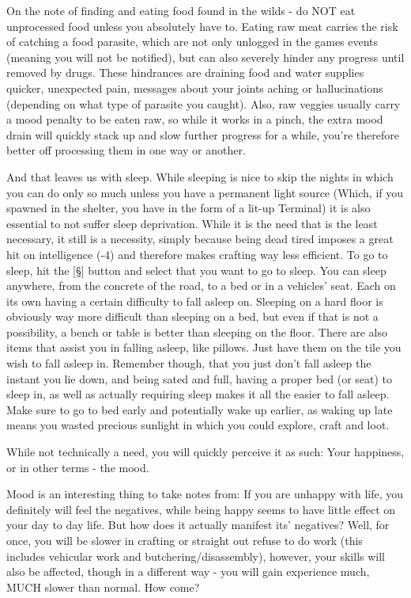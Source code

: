 On the note of finding and eating food found in the wilds - do NOT eat unprocessed food unless you absolutely have to. Eating raw meat carries the risk of catching a food parasite, which are not only unlogged in the games events (meaning you will not be notified), but can also severely hinder any progress until removed by drugs. These hindrances are draining food and water supplies quicker, unexpected pain, messages about your joints aching or hallucinations (depending on what type of parasite you caught). Also, raw veggies usually carry a mood penalty to be eaten raw, so while it works in a pinch, the extra mood drain will quickly stack up and slow further progress for a while, you're therefore better off processing them in one way or another.

And that leaves us with sleep. While sleeping is nice to skip the nights in which you can do only so much unless you have a permanent light source (Which, if you spawned in the shelter, you have in the form of a lit-up Terminal) it is also essential to not suffer sleep deprivation. While it is the need that is the least necessary, it still is a necessity, simply because being dead tired imposes a great hit on intelligence (-4) and therefore makes crafting way less efficient. To go to sleep, hit the [\S] button and select that you want to go to sleep. You can sleep anywhere, from the concrete of the road, to a bed or in a vehicles' seat. Each on its own having a certain difficulty to fall asleep on. Sleeping on a hard floor is obviously way more difficult than sleeping on a bed, but even if that is not a possibility, a bench or table is better than sleeping on the floor. There are also items that assist you in falling asleep, like pillows. Just have them on the tile you wish to fall asleep in. Remember though, that you just don't fall asleep the instant you lie down, and being sated and full, having a proper bed (or seat) to sleep in, as well as actually requiring sleep makes it all the easier to fall asleep. Make sure to go to bed early and potentially wake up earlier, as waking up late means you wasted precious sunlight in which you could explore, craft and loot.

While not technically a need, you will quickly perceive it as such: Your happiness, or in other terms - the mood.

Mood is an interesting thing to take notes from: If you are unhappy with life, you definitely will feel the negatives, while being happy seems to have little effect on your day to day life. But how does it actually manifest its' negatives? Well, for once, you will be slower in crafting or straight out refuse to do work (this includes vehicular work and butchering/disassembly), however, your skills will also be affected, though in a different way - you will gain experience much, MUCH slower than normal. How come?


